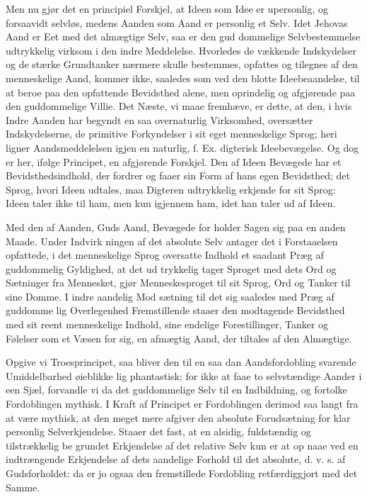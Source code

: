 \documentclass[12pt]{book}
\newcommand{\opage}[1]{\marginnote{\footnotesize\textit{[#1]}}}
\begin{document}
Men nu gjør det en principiel Forskjel, at Ideen
som Idee er upersonlig, og forsaavidt selvløs, medens
Aanden som Aand er personlig et Selv. Idet Jehovas
Aand er Eet med det almægtige Selv, saa er den gud\-%
dommelige Selvbestemmelse udtrykkelig virksom i den
indre Meddelelse. Hvorledes de vækkende Indskydelser
og de stærke Grundtanker nærmere skulle bestemmes,
opfattes og tilegnes af den menneskelige Aand, kommer
ikke, saaledes som ved den blotte Ideebeaandelse, til at
beroe paa den opfattende Bevidsthed alene, men oprindelig
og afgjørende paa den guddommelige Villie. Det Næste, vi
maae fremhæve, er dette, at den, i hvis Indre Aanden
har begyndt en saa overnaturlig Virksomhed, oversætter
Indskydelserne, de primitive Forkyndelser i sit eget
menneskelige Sprog; heri ligner Aandsmeddelelsen igjen
en naturlig, f. Ex. digterisk Ideebevægelse. Og dog
er her, ifølge Principet, en afgjørende Forskjel. Den af
Ideen Bevægede har et Bevidsthedsindhold, der fordrer
og faaer sin Form af hans egen Bevidsthed; det Sprog,
hvori Ideen udtales, maa Digteren udtrykkelig erkjende
for sit Sprog: Ideen taler ikke til ham, men kun
igjennem ham, idet han taler ud af Ideen.

Med den af Aanden, Guds Aand, Bevægede for\-%
holder Sagen sig paa en anden Maade. Under Indvirk\-%
ningen af det absolute Selv antager det i Forstaaelsen
opfattede, i det menneskelige Sprog oversatte Indhold et
\opage{187}\setcounter{footnote}{0}%
saadant Præg af guddommelig Gyldighed, at det ud\-%
trykkelig tager Sproget med dets Ord og Sætninger fra
Mennesket, gjør Menneskesproget til sit Sprog, Ord
og Tanker til sine Domme. I indre aandelig Mod\-%
sætning til det sig saaledes med Præg af guddomme\-%
lig Overlegenhed Fremstillende staaer den modtagende
Bevidsthed med sit reent menneskelige Indhold, sine
endelige Forestillinger, Tanker og Følelser som et
Væsen for sig, en afmægtig Aand, der tiltales af den
Almægtige.

Opgive vi Troesprincipet, saa bliver den til en saa\-%
dan Aandsfordobling svarende Umiddelbarhed øieblikke\-%
lig phantastisk; for ikke at faae to selvstændige Aander
i een Sjæl, forvandle vi da det guddommelige Selv til en
Indbildning, og fortolke Fordoblingen mythisk. I Kraft
af Principet er Fordoblingen derimod saa langt fra at
være mythisk, at den meget mere afgiver den absolute
Forudsætning for klar personlig Selverkjendelse. Staaer
det fast, at en alsidig, fuldstændig og tilstrækkelig be\-%
grundet Erkjendelse af det relative Selv kun er at op\-%
naae ved en indtrængende Erkjendelse af dets aandelige
Forhold til det absolute, d. v. s. af Gudsforholdet: da
er jo ogsaa den fremstillede Fordobling retfærdiggjort
med det Samme.
\end{document}

